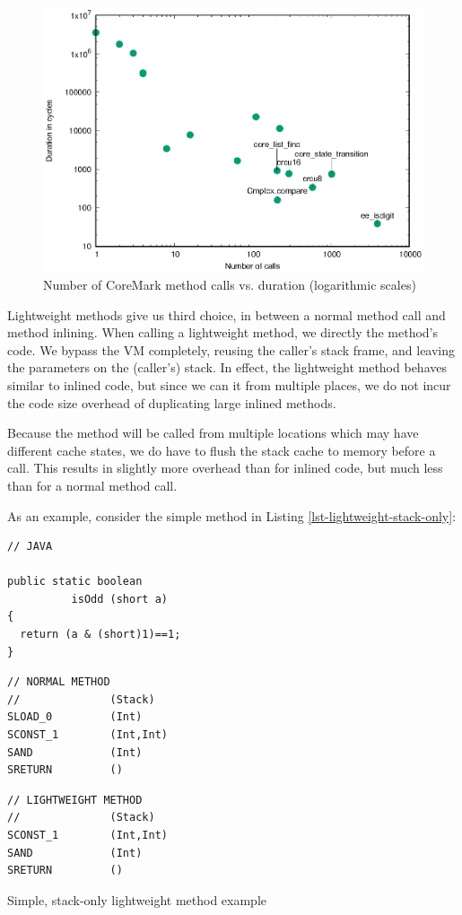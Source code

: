 \begin{figure}
\centering
\includegraphics[width=.5\linewidth]{method-calls-vs-duration.eps}
\caption[Number of CoreMark method calls vs. duration]{Number of CoreMark method calls vs. duration (logarithmic scales)}
\label{fig-coremark-method-calls-vs-duration}
\end{figure}

Lightweight methods give us third choice, in between a normal method call and method inlining. When calling a lightweight method, we directly  the method's code. We bypass the VM completely, reusing the caller's stack frame, and leaving the parameters on the (caller's) stack. In effect, the lightweight method behaves similar to inlined code, but since we can  it from multiple places, we do not incur the code size overhead of duplicating large inlined methods.

Because the method will be called from multiple locations which may have different cache states, we do have to flush the stack cache to memory before a call. This results in slightly more overhead than for inlined code, but much less than for a normal method call.

As an example, consider the simple  method in Listing \ref{lst-lightweight-stack-only}:

\begin{listing}
\centering
\begin{minipage}[t]{0.32\textwidth}
\centering
\begin{verbatim}
// JAVA

public static boolean
          isOdd (short a)
{
  return (a & (short)1)==1;
}
\end{verbatim}
\end{minipage}\hfill
\begin{minipage}[t]{0.29\textwidth}
\centering
\begin{verbatim}
// NORMAL METHOD
//              (Stack)
SLOAD_0         (Int)
SCONST_1        (Int,Int)
SAND            (Int)
SRETURN         ()
\end{verbatim}
\end{minipage}\hfill
\begin{minipage}[t]{0.29\textwidth}
\centering
\begin{verbatim}
// LIGHTWEIGHT METHOD
//              (Stack)
SCONST_1        (Int,Int)
SAND            (Int)
SRETURN         ()
\end{verbatim}
\end{minipage}
\caption{Simple, stack-only lightweight method example}
\label{lst-lightweight-stack-only}
\end{listing}


